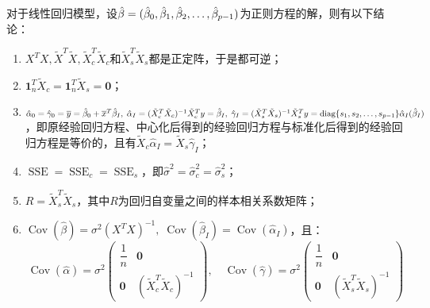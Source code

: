 \begin{theorem}\label{theo:LinearRegressionModel}
	对于线性回归模型，设$\hat{\beta}=(\hat{\beta}_0,\hat{\beta}_1, \hat{\beta}_2, \dots, \hat{\beta}_{p-1})$为正则方程的解，则有以下结论：
	\begin{enumerate}
		\item $X^TX,\tilde{X}^T\tilde{X},\tilde{X}_c^T\tilde{X}_c$和$\tilde{X}_s^T\tilde{X}_s$都是正定阵，于是都可逆；
		\item $\mathbf{1}_n^T\tilde{X}_c=\mathbf{1}_n^T\tilde{X}_s=\mathbf{0}$；
		\item $\hat{\alpha}_0=\hat{\gamma}_0=\overline{y}=\hat{\beta}_0+\overline{x}^T\hat{\beta}_I,\;\hat{\alpha}_I=(\tilde{X}_c^T\tilde{X}_c)^{-1}\tilde{X}_c^Ty=\hat{\beta}_I,\;\hat{\gamma}_I=(\tilde{X}_s^T\tilde{X}_s)^{-1}\tilde{X}_s^Ty=\operatorname{diag}\{s_1, s_2, \dots, s_{p-1}\}\hat{\alpha}_I(\hat{\beta}_I)$，即原经验回归方程、中心化后得到的经验回归方程与标准化后得到的经验回归方程是等价的，且有$\tilde{X}_c\hat{\alpha}_I=\tilde{X}_s\hat{\gamma}_I$；
		\item $\operatorname{SSE}=\operatorname{SSE}_c=\operatorname{SSE}_s$，即$\hat{\sigma}^2=\hat{\sigma}_c^2=\hat{\sigma}_s^2$；
		\item $R=\tilde{X}_s^T\tilde{X}_s$，其中$R$为回归自变量之间的样本相关系数矩阵；
		\item $\operatorname{Cov}(\hat{\beta})=\sigma^2(X^TX)^{-1},\;\operatorname{Cov}(\hat{\beta}_I)=\operatorname{Cov}(\hat{\alpha}_I)$，且：
		\begin{equation*}
			\operatorname{Cov}(\hat{\alpha})=\sigma^2
			\begin{pmatrix}
				\dfrac{1}{n} & \mathbf{0} \\
				\mathbf{0} & (\tilde{X}_c^T\tilde{X}_c)^{-1}
			\end{pmatrix},\quad
			\operatorname{Cov}(\hat{\gamma})=\sigma^2
			\begin{pmatrix}
				\dfrac{1}{n} & \mathbf{0} \\
				\mathbf{0} & (\tilde{X}_s^T\tilde{X}_s)^{-1}
			\end{pmatrix}
		\end{equation*}
	\end{enumerate}
\end{theorem}
